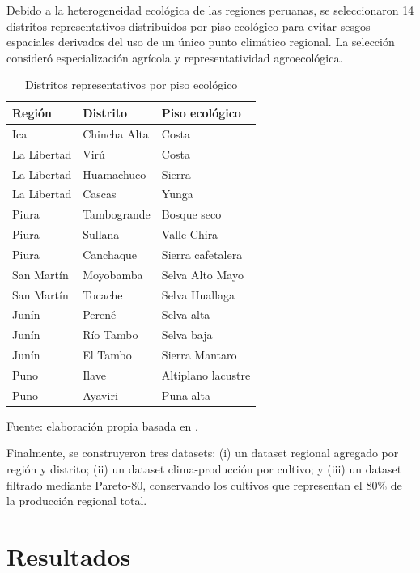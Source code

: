 \documentclass[conference]{IEEEtran}
\begin{document}
Debido a la heterogeneidad ecológica de las regiones peruanas, se seleccionaron 14 distritos representativos distribuidos por piso ecológico para evitar sesgos espaciales derivados del uso de un único punto climático regional. La selección consideró especialización agrícola y representatividad agroecológica.

\begin{table}[h]
\centering
\caption{Distritos representativos por piso ecológico}
\label{tab:distritos}
\small
\begin{tabular}{l l l}
\toprule
\textbf{Región} & \textbf{Distrito} & \textbf{Piso ecológico} \\
\midrule
Ica & Chincha Alta & Costa \\
La Libertad & Virú & Costa \\
La Libertad & Huamachuco & Sierra \\
La Libertad & Cascas & Yunga \\
Piura & Tambogrande & Bosque seco \\
Piura & Sullana & Valle Chira \\
Piura & Canchaque & Sierra cafetalera \\
San Martín & Moyobamba & Selva Alto Mayo \\
San Martín & Tocache & Selva Huallaga \\
Junín & Perené & Selva alta \\
Junín & Río Tambo & Selva baja \\
Junín & El Tambo & Sierra Mantaro \\
Puno & Ilave & Altiplano lacustre \\
Puno & Ayaviri & Puna alta \\
\bottomrule
\end{tabular}
\end{table}

{\footnotesize Fuente: elaboración propia basada en \cite{redesarrolloica2021, esan2023, cepiura2023, dataperu2021, inei1996, midagripuno2020}.}

Finalmente, se construyeron tres datasets: (i) un dataset regional agregado por región y distrito; (ii) un dataset clima-producción por cultivo; y (iii) un dataset filtrado mediante Pareto-80, conservando los cultivos que representan el 80\% de la producción regional total.


\section{Resultados}
\end{document}
